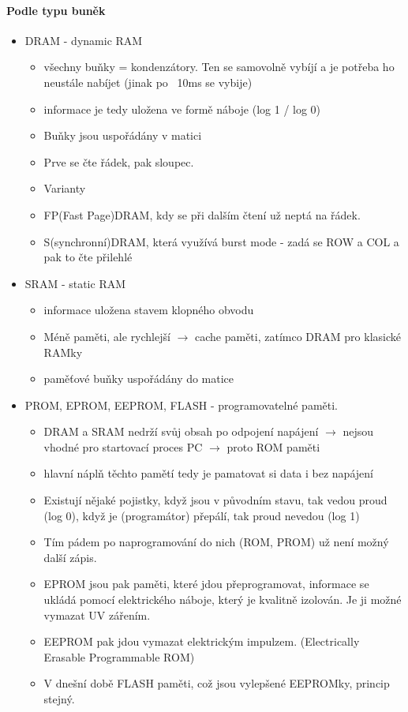 \documentclass[10pt,a4paper]{article}
\begin{document}
\paragraph{Podle typu buněk}
\begin{itemize}
\item DRAM - dynamic RAM
\begin{itemize}
\item všechny buňky = kondenzátory. Ten se samovolně vybíjí a je potřeba ho neustále nabíjet (jinak po ~10ms se vybije)
\item informace je tedy uložena ve formě náboje (log 1 / log 0)
\item Buňky jsou uspořádány v matici
\item Prve se čte řádek, pak sloupec.
\item Varianty
\item FP(Fast Page)DRAM, kdy se při dalším čtení už neptá na řádek.
\item S(synchronní)DRAM, která využívá burst mode - zadá se ROW a COL a pak to čte přilehlé
\end{itemize}
\item SRAM - static RAM
\begin{itemize}
\item informace uložena stavem klopného obvodu
\item Méně paměti, ale rychlejší $\rightarrow$ cache paměti, zatímco DRAM pro klasické RAMky
\item paměťové buňky uspořádány do matice
\end{itemize}
\item PROM, EPROM, EEPROM, FLASH - programovatelné paměti.
\begin{itemize}
\item DRAM a SRAM nedrží svůj obsah po odpojení napájení $\rightarrow$ nejsou vhodné pro startovací proces PC $\rightarrow$ proto ROM paměti
\item hlavní náplň těchto pamětí tedy je pamatovat si data i bez napájení
\item Existují nějaké pojistky, když jsou v původním stavu, tak vedou proud (log 0), když je (programátor) přepálí, tak proud nevedou (log 1)
\item Tím pádem po naprogramování do nich (ROM, PROM) už není možný další zápis.
\item EPROM jsou pak paměti, které jdou přeprogramovat, informace se ukládá pomocí elektrického náboje, který je kvalitně izolován. Je ji možné vymazat UV zářením.
\item EEPROM pak jdou vymazat elektrickým impulzem. (Electrically Erasable Programmable ROM)
\item V dnešní době FLASH paměti, což jsou vylepšené EEPROMky, princip stejný.
\end{itemize}
\end{itemize}
\end{document}
